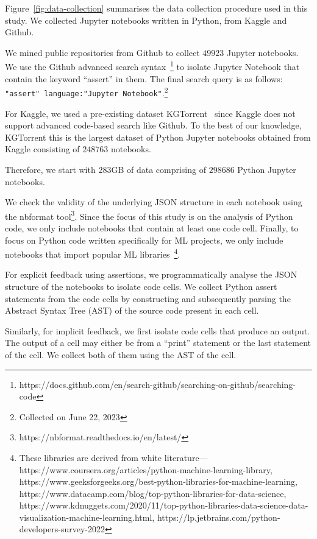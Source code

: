 Figure~\ref{fig:data-collection} summarises the data collection procedure used in this study. We collected Jupyter notebooks written in Python, from Kaggle and Github. 

We mined public repositories from Github to collect $49923$ Jupyter notebooks. We use the Github advanced search syntax~\footnote{https://docs.github.com/en/search-github/searching-on-github/searching-code} to isolate Jupyter Notebook that contain the keyword ``assert'' in them. The final search query is as follows: \texttt{"assert" language:"Jupyter Notebook"}.\footnote{Collected on June 22, 2023}

For Kaggle, we used a pre-existing dataset KGTorrent~\cite{quaranta2021kgtorrent} since Kaggle does not support advanced code-based search like Github. To the best of our knowledge, KGTorrent this is the largest dataset of Python Jupyter notebooks obtained from Kaggle consisting of $248763$ notebooks.

Therefore, we start with 283GB of data comprising of $298686$ Python Jupyter notebooks.

We check the validity of the underlying JSON structure in each notebook using the nbformat tool\footnote{https://nbformat.readthedocs.io/en/latest/}. Since the focus of this study is on the analysis of Python code, we only include notebooks that contain at least one code cell. Finally, to focus on Python code written specifically for ML projects, we only include notebooks that import popular ML libraries~\footnote{These libraries are derived from white literature---https://www.coursera.org/articles/python-machine-learning-library, https://www.geeksforgeeks.org/best-python-libraries-for-machine-learning, https://www.datacamp.com/blog/top-python-libraries-for-data-science, https://www.kdnuggets.com/2020/11/top-python-libraries-data-science-data-visualization-machine-learning.html, https://lp.jetbrains.com/python-developers-survey-2022}.

For explicit feedback using assertions, we programmatically analyse the JSON structure of the notebooks to isolate code cells. We collect Python assert statements from the code cells by constructing and subsequently parsing the Abstract Syntax Tree (AST) of the source code present in each cell.

Similarly, for implicit feedback, we first isolate code cells that produce an output. The output of a cell may either be from a ``print'' statement or the last statement of the cell. We collect both of them using the AST of the cell.

